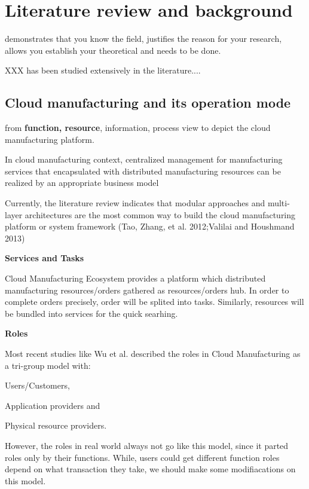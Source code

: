 \section{Literature review and background} %
\label{sec:literature_review}
demonstrates that you know the field, justifies the reason for your research, allows you establish your theoretical and needs to be done.


XXX has been studied extensively in the literature....
\subsection{Cloud manufacturing and its operation mode} %
\label{sub:cloud_manufacturing review}
from \textbf{function, resource}, information, process view to depict the cloud manufacturing platform.

In cloud manufacturing context, centralized management for manufacturing services that encapsulated with distributed manufacturing resources can be realized by an appropriate business model\cite{Xu2012}

Currently, the literature review indicates that modular approaches and multi-layer architectures are the most common way to build the cloud manufacturing platform or system framework (Tao, Zhang, et al. 2012;Valilai and Houshmand 2013)

\textbf{Services and Tasks}

Cloud Manufacturing Ecosystem provides a platform which distributed manufacturing resources/orders gathered as resources/orders hub. In order to complete orders precisely, order will be splited into tasks. Similarly, resources will be bundled into services for the quick searhing.

\textbf{Roles}

Most recent studies like Wu et al.\cite{Wu2013} described the roles in Cloud Manufacturing as a tri-group model with:\begin{inparaenum}[1)]
\item Users/Customers,
\item Application providers and
\item Physical resource providers.
\end{inparaenum}
However, the roles in real world always not go like this model, since it parted roles only by their functions. While, users could get different function roles depend on what transaction they take, we should make some modifiacations on this model.



